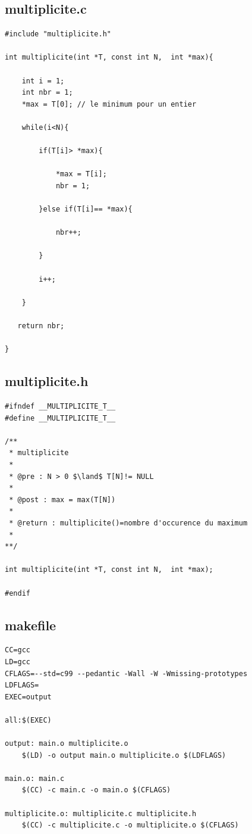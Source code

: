 \documentclass[a4paper, 11pt, oneside]{article}
\begin{document}
\subsection{multiplicite.c}

\begin{lstlisting}[caption={multiplicite.c}]
#include "multiplicite.h"

int multiplicite(int *T, const int N,  int *max){
   
    int i = 1;
    int nbr = 1;
    *max = T[0]; // le minimum pour un entier 

    while(i<N){

        if(T[i]> *max){

            *max = T[i];
            nbr = 1;

        }else if(T[i]== *max){

            nbr++;

        }

        i++;

    }

   return nbr;

}
\end{lstlisting}


\subsection{multiplicite.h}

\begin{lstlisting}[caption={multiplicite.h}]
#ifndef __MULTIPLICITE_T__
#define __MULTIPLICITE_T__

/**
 * multiplicite
 * 
 * @pre : N > 0 $\land$ T[N]!= NULL
 * 
 * @post : max = max(T[N]) 
 * 
 * @return : multiplicite()=nombre d'occurence du maximum 
 * 
**/

int multiplicite(int *T, const int N,  int *max);

#endif
\end{lstlisting}


\subsection{makefile}

\begin{lstlisting}[caption={makefile}]
CC=gcc
LD=gcc
CFLAGS=--std=c99 --pedantic -Wall -W -Wmissing-prototypes
LDFLAGS=
EXEC=output

all:$(EXEC)

output: main.o multiplicite.o
	$(LD) -o output main.o multiplicite.o $(LDFLAGS)

main.o: main.c
	$(CC) -c main.c -o main.o $(CFLAGS)

multiplicite.o: multiplicite.c multiplicite.h
	$(CC) -c multiplicite.c -o multiplicite.o $(CFLAGS)
\end{lstlisting}
\end{document}
